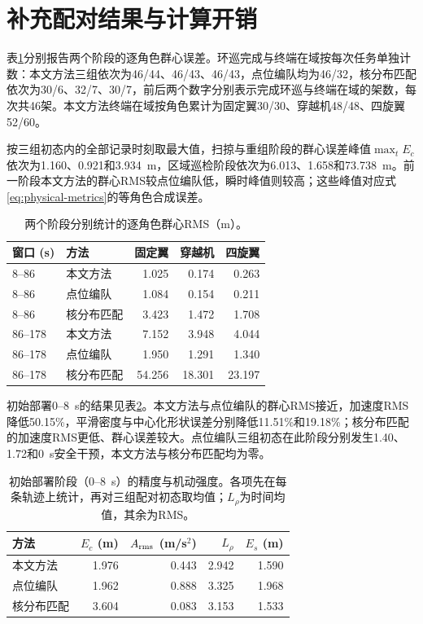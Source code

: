 \documentclass[UTF8,a4paper,11pt,fontset=none]{ctexart}
\begin{document}
\section{补充配对结果与计算开销}\label{app:supplement}
表\ref{tab:role-results}分别报告两个阶段的逐角色群心误差。环巡完成与终端在域按每次任务单独计数：本文方法三组依次为46/44、46/43、46/43，点位编队均为46/32，核分布匹配依次为30/6、32/7、30/7，前后两个数字分别表示完成环巡与终端在域的架数，每次共46架。本文方法终端在域按角色累计为固定翼30/30、穿越机48/48、四旋翼52/60。

按三组初态内的全部记录时刻取最大值，扫掠与重组阶段的群心误差峰值$\max_t E_c$依次为1.160、0.921和3.934~m，区域巡检阶段依次为6.013、1.658和73.738~m。前一阶段本文方法的群心RMS较点位编队低，瞬时峰值则较高；这些峰值对应式\eqref{eq:physical-metrics}的等角色合成误差。

\begin{table}[htbp]\centering\small
\caption{两个阶段分别统计的逐角色群心RMS（m）。}\label{tab:role-results}
\begin{tabular}{llrrr}\toprule
窗口 (s) & 方法 & 固定翼 & 穿越机 & 四旋翼\\\midrule
8--86 & 本文方法 & 1.025 & 0.174 & 0.263\\
8--86 & 点位编队 & 1.084 & 0.154 & 0.211\\
8--86 & 核分布匹配 & 3.423 & 1.472 & 1.708\\
\midrule
86--178 & 本文方法 & 7.152 & 3.948 & 4.044\\
86--178 & 点位编队 & 1.950 & 1.291 & 1.340\\
86--178 & 核分布匹配 & 54.256 & 18.301 & 23.197\\
\bottomrule\end{tabular}\end{table}

初始部署0--8~s的结果见表\ref{tab:initial-deployment}。本文方法与点位编队的群心RMS接近，加速度RMS降低50.15\%，平滑密度与中心化形状误差分别降低11.51\%和19.18\%；核分布匹配的加速度RMS更低、群心误差较大。点位编队三组初态在此阶段分别发生1.40、1.72和0~s安全干预，本文方法与核分布匹配均为零。

\begin{table}[htbp]\centering\small
\caption{初始部署阶段（0--8~s）的精度与机动强度。各项先在每条轨迹上统计，再对三组配对初态取均值；$L_\rho$为时间均值，其余为RMS。}\label{tab:initial-deployment}
\begin{tabular}{lrrrr}\toprule
方法 & $E_c$ (m) & $A_{\rm rms}$ (m/s$^2$) & $L_\rho$ & $E_s$ (m)\\\midrule
本文方法 & 1.976 & 0.443 & 2.942 & 1.590\\
点位编队 & 1.962 & 0.888 & 3.325 & 1.968\\
核分布匹配 & 3.604 & 0.083 & 3.153 & 1.533\\\bottomrule
\end{tabular}\end{table}
\end{document}
